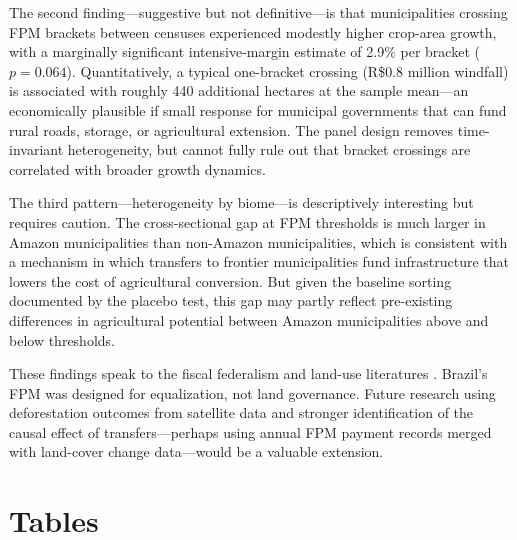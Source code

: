 \documentclass[12pt]{article}
\begin{document}
The second finding---suggestive but not definitive---is that municipalities crossing FPM brackets between censuses experienced modestly higher crop-area growth, with a marginally significant intensive-margin estimate of 2.9\% per bracket ($p=0.064$). Quantitatively, a typical one-bracket crossing (R\$0.8 million windfall) is associated with roughly 440 additional hectares at the sample mean---an economically plausible if small response for municipal governments that can fund rural roads, storage, or agricultural extension. The panel design removes time-invariant heterogeneity, but cannot fully rule out that bracket crossings are correlated with broader growth dynamics.

The third pattern---heterogeneity by biome---is descriptively interesting but requires caution. The cross-sectional gap at FPM thresholds is much larger in Amazon municipalities than non-Amazon municipalities, which is consistent with a mechanism in which transfers to frontier municipalities fund infrastructure that lowers the cost of agricultural conversion. But given the baseline sorting documented by the placebo test, this gap may partly reflect pre-existing differences in agricultural potential between Amazon municipalities above and below thresholds.

These findings speak to the fiscal federalism and land-use literatures \citep{burgess2012unbreakable, ferraz2011electoral}. Brazil's FPM was designed for equalization, not land governance. Future research using deforestation outcomes from satellite data and stronger identification of the causal effect of transfers---perhaps using annual FPM payment records merged with land-cover change data---would be a valuable extension.

\label{apep_main_text_end}



\newpage
\section*{Tables}




\end{document}
